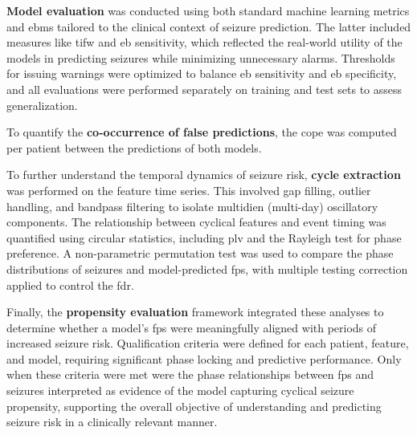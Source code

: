 \textbf{Model evaluation} was conducted using both standard machine learning metrics and \glspl{ebm} tailored to the clinical context of seizure prediction.
The latter included measures like \gls{tifw} and \gls{eb} sensitivity, which reflected the real-world utility of the models in predicting seizures while minimizing unnecessary alarms.
Thresholds for issuing warnings were optimized to balance \gls{eb} sensitivity and \gls{eb} specificity, and all evaluations were performed separately on training and test sets to assess generalization.

To quantify the \textbf{co-occurrence of false predictions}, the \gls{cope} was computed per patient between the predictions of both models.

To further understand the temporal dynamics of seizure risk, \textbf{cycle extraction} was performed on the feature time series.
This involved gap filling, outlier handling, and bandpass filtering to isolate multidien (multi-day) oscillatory components.
The relationship between cyclical features and event timing was quantified using circular statistics, including \gls{plv} and the Rayleigh test for phase preference.
A non-parametric permutation test was used to compare the phase distributions of seizures and model-predicted \glspl{fp}, with multiple testing correction applied to control the \gls{fdr}.

Finally, the \textbf{propensity evaluation} framework integrated these analyses to determine whether a model’s \glspl{fp} were meaningfully aligned with periods of increased seizure risk.
Qualification criteria were defined for each patient, feature, and model, requiring significant phase locking and predictive performance.
Only when these criteria were met were the phase relationships between \glspl{fp} and seizures interpreted as evidence of the model capturing cyclical seizure propensity, supporting the overall objective of understanding and predicting seizure risk in a clinically relevant manner.
